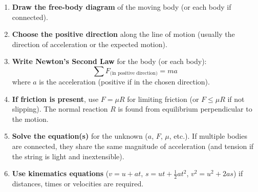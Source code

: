 \documentclass[11pt]{article}
\begin{document}
\begin{methode}[Solving $F=ma$ Problems in a Straight Line]
\begin{enumerate}
    \item \textbf{Draw the free-body diagram} of the moving body (or each body if connected).
    \item \textbf{Choose the positive direction} along the line of motion (usually the direction of acceleration or the expected motion).
    \item \textbf{Write Newton's Second Law} for the body (or each body):
    \[
    \sum F_{\text{(in positive direction)}} = m a
    \]
    where $a$ is the acceleration (positive if in the chosen direction).
    \item \textbf{If friction is present}, use $F = \mu R$ for limiting friction (or $F \le \mu R$ if not slipping). The normal reaction $R$ is found from equilibrium perpendicular to the motion.
    \item \textbf{Solve the equation(s)} for the unknown ($a$, $F$, $\mu$, etc.). If multiple bodies are connected, they share the same magnitude of acceleration (and tension if the string is light and inextensible).
    \item \textbf{Use kinematics equations} ($v=u+at$, $s=ut+\frac{1}{2}at^2$, $v^2=u^2+2as$) if distances, times or velocities are required.
\end{enumerate}
\end{methode}
\end{document}
